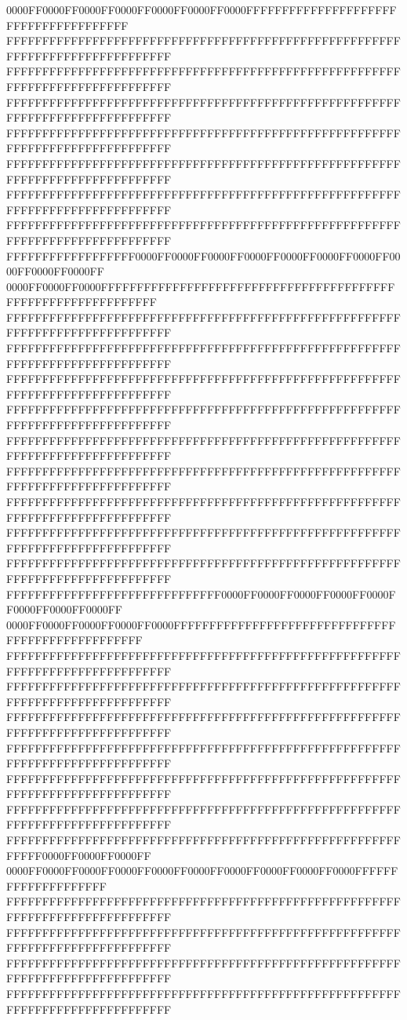0000FF0000FF0000FF0000FF0000FF0000FF0000FFFFFFFFFFFFFFFFFFFFFFFFFFFFFFFFFFFFFF
FFFFFFFFFFFFFFFFFFFFFFFFFFFFFFFFFFFFFFFFFFFFFFFFFFFFFFFFFFFFFFFFFFFFFFFFFFFFFF
FFFFFFFFFFFFFFFFFFFFFFFFFFFFFFFFFFFFFFFFFFFFFFFFFFFFFFFFFFFFFFFFFFFFFFFFFFFFFF
FFFFFFFFFFFFFFFFFFFFFFFFFFFFFFFFFFFFFFFFFFFFFFFFFFFFFFFFFFFFFFFFFFFFFFFFFFFFFF
FFFFFFFFFFFFFFFFFFFFFFFFFFFFFFFFFFFFFFFFFFFFFFFFFFFFFFFFFFFFFFFFFFFFFFFFFFFFFF
FFFFFFFFFFFFFFFFFFFFFFFFFFFFFFFFFFFFFFFFFFFFFFFFFFFFFFFFFFFFFFFFFFFFFFFFFFFFFF
FFFFFFFFFFFFFFFFFFFFFFFFFFFFFFFFFFFFFFFFFFFFFFFFFFFFFFFFFFFFFFFFFFFFFFFFFFFFFF
FFFFFFFFFFFFFFFFFFFFFFFFFFFFFFFFFFFFFFFFFFFFFFFFFFFFFFFFFFFFFFFFFFFFFFFFFFFFFF
FFFFFFFFFFFFFFFFFF0000FF0000FF0000FF0000FF0000FF0000FF0000FF0000FF0000FF0000FF
0000FF0000FF0000FFFFFFFFFFFFFFFFFFFFFFFFFFFFFFFFFFFFFFFFFFFFFFFFFFFFFFFFFFFFFF
FFFFFFFFFFFFFFFFFFFFFFFFFFFFFFFFFFFFFFFFFFFFFFFFFFFFFFFFFFFFFFFFFFFFFFFFFFFFFF
FFFFFFFFFFFFFFFFFFFFFFFFFFFFFFFFFFFFFFFFFFFFFFFFFFFFFFFFFFFFFFFFFFFFFFFFFFFFFF
FFFFFFFFFFFFFFFFFFFFFFFFFFFFFFFFFFFFFFFFFFFFFFFFFFFFFFFFFFFFFFFFFFFFFFFFFFFFFF
FFFFFFFFFFFFFFFFFFFFFFFFFFFFFFFFFFFFFFFFFFFFFFFFFFFFFFFFFFFFFFFFFFFFFFFFFFFFFF
FFFFFFFFFFFFFFFFFFFFFFFFFFFFFFFFFFFFFFFFFFFFFFFFFFFFFFFFFFFFFFFFFFFFFFFFFFFFFF
FFFFFFFFFFFFFFFFFFFFFFFFFFFFFFFFFFFFFFFFFFFFFFFFFFFFFFFFFFFFFFFFFFFFFFFFFFFFFF
FFFFFFFFFFFFFFFFFFFFFFFFFFFFFFFFFFFFFFFFFFFFFFFFFFFFFFFFFFFFFFFFFFFFFFFFFFFFFF
FFFFFFFFFFFFFFFFFFFFFFFFFFFFFFFFFFFFFFFFFFFFFFFFFFFFFFFFFFFFFFFFFFFFFFFFFFFFFF
FFFFFFFFFFFFFFFFFFFFFFFFFFFFFFFFFFFFFFFFFFFFFFFFFFFFFFFFFFFFFFFFFFFFFFFFFFFFFF
FFFFFFFFFFFFFFFFFFFFFFFFFFFFFF0000FF0000FF0000FF0000FF0000FF0000FF0000FF0000FF
0000FF0000FF0000FF0000FF0000FFFFFFFFFFFFFFFFFFFFFFFFFFFFFFFFFFFFFFFFFFFFFFFFFF
FFFFFFFFFFFFFFFFFFFFFFFFFFFFFFFFFFFFFFFFFFFFFFFFFFFFFFFFFFFFFFFFFFFFFFFFFFFFFF
FFFFFFFFFFFFFFFFFFFFFFFFFFFFFFFFFFFFFFFFFFFFFFFFFFFFFFFFFFFFFFFFFFFFFFFFFFFFFF
FFFFFFFFFFFFFFFFFFFFFFFFFFFFFFFFFFFFFFFFFFFFFFFFFFFFFFFFFFFFFFFFFFFFFFFFFFFFFF
FFFFFFFFFFFFFFFFFFFFFFFFFFFFFFFFFFFFFFFFFFFFFFFFFFFFFFFFFFFFFFFFFFFFFFFFFFFFFF
FFFFFFFFFFFFFFFFFFFFFFFFFFFFFFFFFFFFFFFFFFFFFFFFFFFFFFFFFFFFFFFFFFFFFFFFFFFFFF
FFFFFFFFFFFFFFFFFFFFFFFFFFFFFFFFFFFFFFFFFFFFFFFFFFFFFFFFFFFFFFFFFFFFFFFFFFFFFF
FFFFFFFFFFFFFFFFFFFFFFFFFFFFFFFFFFFFFFFFFFFFFFFFFFFFFFFFFFFF0000FF0000FF0000FF
0000FF0000FF0000FF0000FF0000FF0000FF0000FF0000FF0000FF0000FFFFFFFFFFFFFFFFFFFF
FFFFFFFFFFFFFFFFFFFFFFFFFFFFFFFFFFFFFFFFFFFFFFFFFFFFFFFFFFFFFFFFFFFFFFFFFFFFFF
FFFFFFFFFFFFFFFFFFFFFFFFFFFFFFFFFFFFFFFFFFFFFFFFFFFFFFFFFFFFFFFFFFFFFFFFFFFFFF
FFFFFFFFFFFFFFFFFFFFFFFFFFFFFFFFFFFFFFFFFFFFFFFFFFFFFFFFFFFFFFFFFFFFFFFFFFFFFF
FFFFFFFFFFFFFFFFFFFFFFFFFFFFFFFFFFFFFFFFFFFFFFFFFFFFFFFFFFFFFFFFFFFFFFFFFFFFFF

